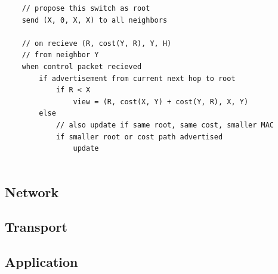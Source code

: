 \begin{lstlisting}
    // propose this switch as root
    send (X, 0, X, X) to all neighbors

    // on recieve (R, cost(Y, R), Y, H)
    // from neighbor Y
    when control packet recieved
        if advertisement from current next hop to root
            if R < X
                view = (R, cost(X, Y) + cost(Y, R), X, Y)
        else 
            // also update if same root, same cost, smaller MAC
            if smaller root or cost path advertised
                update
            
\end{lstlisting}

\subsection{Network}

\subsection{Transport}

\subsection{Application}


